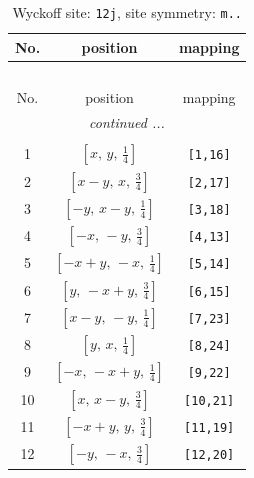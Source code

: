 \documentclass[fleqn,8pt]{jsarticle}
\begin{document}
\begin{longtable}{ccc}
\caption{Wyckoff site: {\tt 12j}, site symmetry: {\tt m..}}
 \\
 \hline \hline
No. & position & mapping \\ \hline \endfirsthead

\multicolumn{2}{l}{\tablename\ \thetable{}} \\
 \hline \hline
No. & position & mapping \\ \hline \endhead

 \hline \hline
\multicolumn{2}{r}{\footnotesize\it continued ...} \\ \endfoot

 \hline \hline
\multicolumn{2}{r}{} \\ \endlastfoot

1 & $\left[ x,\, y,\, \frac{1}{4} \right]$ & {\tt [1,16]} \\ \hline
2 & $\left[ x - y,\, x,\, \frac{3}{4} \right]$ & {\tt [2,17]} \\ \hline
3 & $\left[ - y,\, x - y,\, \frac{1}{4} \right]$ & {\tt [3,18]} \\ \hline
4 & $\left[ - x,\, - y,\, \frac{3}{4} \right]$ & {\tt [4,13]} \\ \hline
5 & $\left[ - x + y,\, - x,\, \frac{1}{4} \right]$ & {\tt [5,14]} \\ \hline
6 & $\left[ y,\, - x + y,\, \frac{3}{4} \right]$ & {\tt [6,15]} \\ \hline
7 & $\left[ x - y,\, - y,\, \frac{1}{4} \right]$ & {\tt [7,23]} \\ \hline
8 & $\left[ y,\, x,\, \frac{1}{4} \right]$ & {\tt [8,24]} \\ \hline
9 & $\left[ - x,\, - x + y,\, \frac{1}{4} \right]$ & {\tt [9,22]} \\ \hline
10 & $\left[ x,\, x - y,\, \frac{3}{4} \right]$ & {\tt [10,21]} \\ \hline
11 & $\left[ - x + y,\, y,\, \frac{3}{4} \right]$ & {\tt [11,19]} \\ \hline
12 & $\left[ - y,\, - x,\, \frac{3}{4} \right]$ & {\tt [12,20]} \\
\end{longtable}
\renewcommand{\arraystretch}{1.2}
\end{document}
